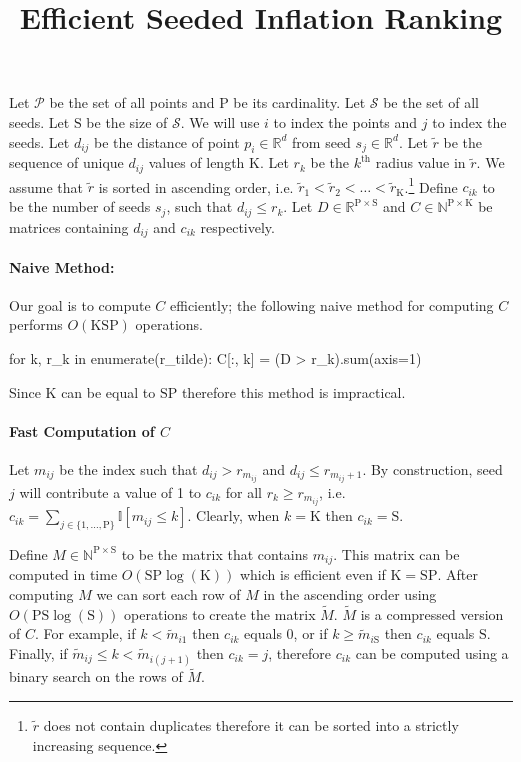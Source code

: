 \documentclass[14pt]{article}
\title{\vspace{-6em}Efficient Seeded Inflation Ranking\vspace{-3em}}
\author{}
\date{}
\renewcommand{\th}[1]{$#1^{\textrm{th}}$}
\newcommand{\tr}[0]{\tilde{r}}
\newcommand{\tM}[0]{\tilde{M}}
\newcommand{\tm}[0]{\tilde{m}}
\newcommand{\rmP}[0]{\mathrm{P}}
\newcommand{\rmK}[0]{\mathrm{K}}
\newcommand{\rmS}[0]{\mathrm{S}}
\begin{document}
\maketitle
Let $\mathcal{P}$ be the set of all points and $\rmP$ be its cardinality.
Let $\mathcal{S}$ be the set of all seeds.
Let $\rmS$ be the size of $\mathcal{S}$.
We will use  $i$ to index the points and $j$ to index the seeds.
Let $d_{ij}$ be the distance of point $p_i \in \mathbb{R}^d$ from
seed $s_j \in \mathbb{R}^d$.
Let $\tr$ be the sequence of unique $d_{ij}$ values of length $\rmK$.
Let $r_k$ be the \th{k} radius value in $\tr$. We assume that $\tr$
is sorted in ascending order, i.e. $\tr_1 < \tr_2 < \ldots < \tr_{\rmK}$.\footnote{$\tr$ does not contain duplicates therefore it can be sorted into a strictly increasing sequence.}
Define $c_{ik}$ to be the number of seeds $s_j$, such that $d_{ij} \le r_k$.
Let $D \in \mathbb{R}^{\rmP \times \rmS}$ and
$C \in \mathbb{N}^{\rmP \times \rmK}$ be matrices containing
$d_{ij}$ and $c_{ik}$ respectively.

\paragraph{Naive Method:}
Our goal is to compute $C$ efficiently; the following naive method
for computing $C$ performs $O(\rmK\rmS\rmP)$ operations.
\begin{python}
  for k, r_k in enumerate(r_tilde):
      C[:, k] = (D > r_k).sum(axis=1)
\end{python}
Since $\rmK$ can be equal to $\mathrm{SP}$ therefore this method is impractical.

\paragraph{Fast Computation of $C$}
Let $m_{ij}$ be the index such that $d_{ij} > r_{m_{ij}}$ and $d_{ij} \le r_{m_{ij} + 1}$.
By construction, seed $j$ will contribute a value of 1 to $c_{ik}$ for all
$r_k \ge r_{m_{ij}}$, i.e. $c_{ik}  = \sum_{j \in \{1, \ldots, \rmP\}} \mathbb{I}[m_{ij} \le k]$. Clearly, when $k=\rmK$ then $c_{ik} = \rmS$.

Define $M \in \mathbb{N}^{\rmP \times \rmS}$ to be the matrix that contains
$m_{ij}$. This matrix can be computed in time $O(\rmS\rmP\log(\rmK))$ which is efficient even if $\rmK = \rmS \rmP$. After computing $M$ we can sort each
row of $M$ in the ascending order using $O(\rmP\rmS\log(\rmS))$
operations to create the matrix $\tM$.
$\tM$ is a compressed version of $C$. For example, if $k < \tm_{i1}$
then $c_{ik}$ equals $0$, or if $k \ge \tm_{i\rmS}$ then $c_{ik}$ equals
$\rmS$. Finally, if $\tm_{ij} \le k < \tm_{i (j+1)}$ then $c_{ik} = j$, therefore
$c_{ik}$ can be computed using a binary search on the rows of $\tM$.
\end{document}
